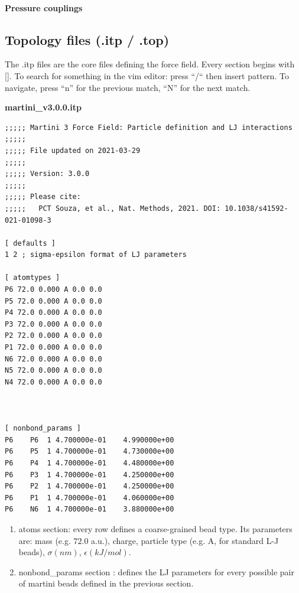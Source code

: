 \paragraph{Pressure couplings}

\subsection{Topology files (.itp / .top)}

The .itp files are  the core files defining the force field. Every section begins with [].
To search for something in the vim editor: press “/“ then insert pattern. To navigate, press “n” for the previous match, “N” for the next match.


\begin{vlinesbox}
\fontsize{8pt}{7pt}\selectfont
\textbf{martini\_v3.0.0.itp}
\begin{verbatim}
;;;;; Martini 3 Force Field: Particle definition and LJ interactions
;;;;;
;;;;; File updated on 2021-03-29
;;;;;
;;;;; Version: 3.0.0
;;;;;
;;;;; Please cite:
;;;;;   PCT Souza, et al., Nat. Methods, 2021. DOI: 10.1038/s41592-021-01098-3

[ defaults ]
1 2 ; sigma-epsilon format of LJ parameters

[ atomtypes ]
P6 72.0 0.000 A 0.0 0.0
P5 72.0 0.000 A 0.0 0.0
P4 72.0 0.000 A 0.0 0.0
P3 72.0 0.000 A 0.0 0.0
P2 72.0 0.000 A 0.0 0.0
P1 72.0 0.000 A 0.0 0.0
N6 72.0 0.000 A 0.0 0.0
N5 72.0 0.000 A 0.0 0.0
N4 72.0 0.000 A 0.0 0.0



[ nonbond_params ]
P6    P6  1 4.700000e-01    4.990000e+00
P6    P5  1 4.700000e-01    4.730000e+00
P6    P4  1 4.700000e-01    4.480000e+00
P6    P3  1 4.700000e-01    4.250000e+00
P6    P2  1 4.700000e-01    4.250000e+00
P6    P1  1 4.700000e-01    4.060000e+00
P6    N6  1 4.700000e-01    3.880000e+00

\end{verbatim}
\end{vlinesbox}


\begin{enumerate}
    \item atoms section: every row defines a coarse-grained bead type. Its parameters 
    are: mass (e.g. $72.0$ a.u.), charge, particle type (e.g. A, for standard L-J beads), $\sigma (nm)$,
     $\epsilon (kJ/mol)$.
    \item nonbond\_params section : defines the LJ parameters for every possible pair of martini beads defined in the previous section.
\end{enumerate}


